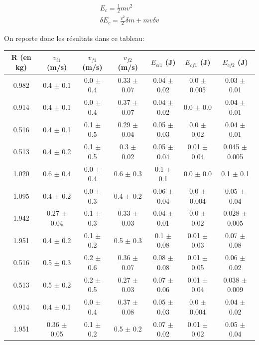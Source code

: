 \documentclass[12pt]{article}
\begin{document}
\begin{gather}
    E_c = \frac{1}{2} m v^2 \\
    \delta E_c = \frac{v^2}{2} \delta m + mv \delta v
\end{gather}

On reporte donc les résultats dans ce tableau:


\begin{table}[h!]
    \begin{center}
        \begin{tabular}{|c|c|c|c|c|c|c|}
            \hline
            R (en kg) & $v_{i1}$ (m/s) & $v_{f1}$ (m/s) & $v_{f2}$ (m/s) & $E_{ci1}$ (J) & $E_{cf1}$ (J) & $E_{cf2}$ (J) \\ \hline
            0.982 & 0.4 $\pm$ 0.1 & 0.0 $\pm$ 0.4 & 0.33 $\pm$ 0.07 & 0.04 $\pm$ 0.02 & 0.0 $\pm$ 0.005 & 0.03 $\pm$ 0.01 \\ 
            0.914 & 0.4 $\pm$ 0.1 & 0.0 $\pm$ 0.4 & 0.37 $\pm$ 0.07 & 0.04 $\pm$ 0.02 & 0.0 $\pm$ 0.0 & 0.04 $\pm$ 0.01 \\ 
            0.516 & 0.4 $\pm$ 0.1 & 0.1 $\pm$ 0.5 & 0.29 $\pm$ 0.04 & 0.05 $\pm$ 0.03 & 0.0 $\pm$ 0.02 & 0.04 $\pm$ 0.01 \\ 
            0.513 & 0.4 $\pm$ 0.2 & 0.1 $\pm$ 0.5 & 0.3 $\pm$ 0.02 & 0.05 $\pm$ 0.04 & 0.01 $\pm$ 0.04 & 0.045 $\pm$ 0.005 \\ 
            1.020 & 0.6 $\pm$ 0.4 & 0.0 $\pm$ 0.4 & 0.6 $\pm$ 0.3 & 0.1 $\pm$ 0.1 & 0.0 $\pm$ 0.0 & 0.1 $\pm$ 0.1 \\ 
            1.095 & 0.4 $\pm$ 0.2 & 0.0 $\pm$ 0.3 & 0.4 $\pm$ 0.2 & 0.06 $\pm$ 0.04 & 0.0 $\pm$ 0.004 & 0.05 $\pm$ 0.04 \\ 
            1.942 & 0.27 $\pm$ 0.04 & 0.1 $\pm$ 0.3 & 0.33 $\pm$ 0.03 & 0.04 $\pm$ 0.01 & 0.0 $\pm$ 0.02 & 0.028 $\pm$ 0.005 \\ 
            1.951 & 0.4 $\pm$ 0.2 & 0.1 $\pm$ 0.2 & 0.5 $\pm$ 0.3 & 0.1 $\pm$ 0.08 & 0.01 $\pm$ 0.03 & 0.07 $\pm$ 0.08 \\ 
            0.516 & 0.5 $\pm$ 0.3 & 0.2 $\pm$ 0.6 & 0.36 $\pm$ 0.07 & 0.08 $\pm$ 0.08 & 0.01 $\pm$ 0.05 & 0.06 $\pm$ 0.02 \\ 
            0.513 & 0.5 $\pm$ 0.2 & 0.2 $\pm$ 0.5 & 0.27 $\pm$ 0.03 & 0.07 $\pm$ 0.06 & 0.01 $\pm$ 0.04 & 0.038 $\pm$ 0.009 \\ 
            0.914 & 0.4 $\pm$ 0.1 & 0.0 $\pm$ 0.4 & 0.37 $\pm$ 0.08 & 0.05 $\pm$ 0.03 & 0.0 $\pm$ 0.004 & 0.04 $\pm$ 0.02 \\ 
            1.951 & 0.36 $\pm$ 0.05 & 0.1 $\pm$ 0.2 & 0.5 $\pm$ 0.2 & 0.07 $\pm$ 0.02 & 0.01 $\pm$ 0.02 & 0.05 $\pm$ 0.04 \\ 
            \hline
        \end{tabular}
    \end{center}
\end{table}
\end{document}

